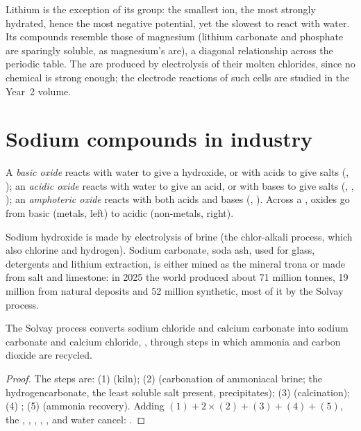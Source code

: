 Lithium is the exception of its group: the smallest ion, the most
strongly hydrated, hence the most negative potential, yet the slowest to
react with water. Its compounds resemble those of magnesium (lithium
carbonate and phosphate are sparingly soluble, as magnesium's are), a
diagonal relationship across the periodic table. The  are
produced by electrolysis of their molten chlorides, since no chemical
 is strong enough; the electrode reactions of such cells are
studied in the Year~2 volume.

\section{Sodium compounds in industry}

\begin{definition}\label{def:b1:s-block:oxide-character}
A \emph{basic oxide} reacts with water to give a
hydroxide, or with acids to give salts (, ); an
\emph{acidic oxide} reacts with water to give an acid,
or with bases to give salts (, , ); an
\emph{amphoteric oxide} reacts with both acids and
bases (, ). Across a , oxides go from basic
(metals, left) to acidic (non-metals, right).
\end{definition}

Sodium hydroxide is made by electrolysis of brine (the chlor-alkali
process, which also  chlorine and hydrogen). Sodium carbonate, soda
ash, used for glass, detergents and lithium extraction, is either mined
as the mineral trona or made from salt and limestone: in 2025 the world
produced about 71 million tonnes, 19 million from natural deposits and 52
million synthetic, most of it by the Solvay process.

\begin{proposition}\label{prop:b1:s-block:solvay}
The Solvay process converts sodium chloride and calcium carbonate into
sodium carbonate and calcium chloride, , through steps in which ammonia and carbon dioxide are recycled.
\end{proposition}

\begin{proof}
The steps are: (1)  (kiln); (2)  (carbonation of ammoniacal brine; the
hydrogencarbonate, the least soluble salt present, precipitates); (3)
 (calcination); (4) ; (5)  (ammonia
recovery). Adding $(1) + 2\times(2) + (3) + (4) + (5)$, the ,
, , , ,  and water cancel:
.
\end{proof}

